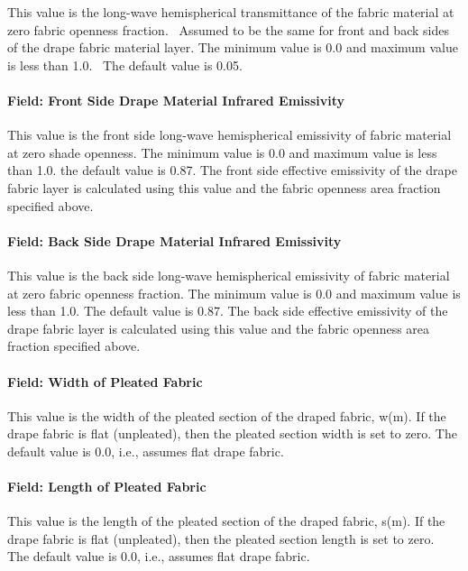 This value is the long-wave hemispherical transmittance of the fabric material at zero fabric openness fraction.~ Assumed to be the same for front and back sides of the drape fabric material layer. The minimum value is 0.0 and maximum value is less than 1.0.~ The default value is 0.05.

\paragraph{Field: Front Side Drape Material Infrared Emissivity}\label{field-front-side-drape-material-infrared-emissivity}

This value is the front side long-wave hemispherical emissivity of fabric material at zero shade openness. The minimum value is 0.0 and maximum value is less than 1.0. the default value is 0.87. The front side effective emissivity of the drape fabric layer is calculated using this value and the fabric openness area fraction specified above.

\paragraph{Field: Back Side Drape Material Infrared Emissivity}\label{field-back-side-drape-material-infrared-emissivity}

This value is the back side long-wave hemispherical emissivity of fabric material at zero fabric openness fraction. The minimum value is 0.0 and maximum value is less than 1.0. The default value is 0.87. The back side effective emissivity of the drape fabric layer is calculated using this value and the fabric openness area fraction specified above.

\paragraph{Field: Width of Pleated Fabric}\label{field-width-of-pleated-fabric}

This value is the width of the pleated section of the draped fabric, w(m). If the drape fabric is flat (unpleated), then the pleated section width is set to zero. The default value is 0.0, i.e., assumes flat drape fabric.

\paragraph{Field: Length of Pleated Fabric}\label{field-length-of-pleated-fabric}

This value is the length of the pleated section of the draped fabric, s(m). If the drape fabric is flat (unpleated), then the pleated section length is set to zero.~ The default value is 0.0, i.e., assumes flat drape fabric.

